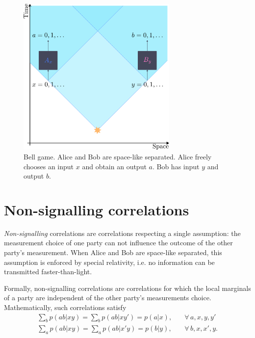 \begin{figure}
	\begin{center}
		\includegraphics[width=0.7\textwidth]{chapters/overview/img/belltest.pdf}
	\end{center}
	\caption{Bell game. Alice and Bob are space-like separated. Alice freely chooses an input $x$ and obtain an output $a$. Bob has input $y$ and output $b$.}
	\label{fig:belltest}
\end{figure}



\section{Non-signalling correlations}

\textit{Non-signalling} correlations are correlations respecting a single assumption: the measurement choice of one party can not influence the outcome of the other party's measurement.
When Alice and Bob are space-like separated, this assumption is enforced by special relativity, i.e. no information can be transmitted faster-than-light.

Formally, non-signalling correlations are correlations for which the local marginals of a party are independent of the other party's measurements choice. 
Mathematically, such correlations satisfy
\begin{align}
	\sum_b p(ab|xy) = \sum_b p(ab|xy') = p(a|x), \quad &\forall\,a,x,y,y' \\
	\sum_a p(ab|xy) = \sum_a p(ab|x'y) = p(b|y), \quad &\forall\,b,x,x',y.
	\label{eq:non-signalling}
\end{align}


